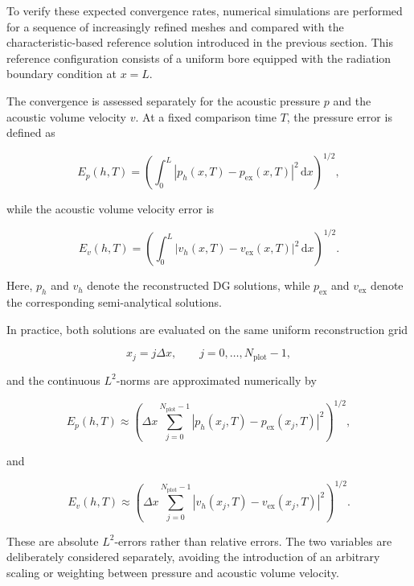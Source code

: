 \documentclass[11pt,a4paper]{report}
\theoremstyle{plain}
\theoremstyle{definition}
\begin{document}
To verify these expected convergence rates, numerical simulations are performed
for a sequence of increasingly refined meshes and compared with the
characteristic-based reference solution introduced in the previous section.
This reference configuration consists of a uniform bore equipped with the
radiation boundary condition at \(x=L\).

The convergence is assessed separately for the acoustic pressure \(p\) and the
acoustic volume velocity \(v\). At a fixed comparison time \(T\), the pressure
error is defined as

\begin{equation}
E_p(h,T)
=
\left(
\int_0^L
\left|
p_h(x,T)-p_{\mathrm{ex}}(x,T)
\right|^2
\,\mathrm dx
\right)^{1/2},
\label{eq:error_pressure}
\end{equation}

while the acoustic volume velocity error is

\begin{equation}
E_v(h,T)
=
\left(
\int_0^L
\left|
v_h(x,T)-v_{\mathrm{ex}}(x,T)
\right|^2
\,\mathrm dx
\right)^{1/2}.
\label{eq:error_velocity}
\end{equation}

Here, \(p_h\) and \(v_h\) denote the reconstructed DG solutions, while
\(p_{\mathrm{ex}}\) and \(v_{\mathrm{ex}}\) denote the corresponding semi-analytical
solutions.

In practice, both solutions are evaluated on the same uniform reconstruction
grid

\begin{equation}
x_j=j\Delta x,
\qquad
j=0,\ldots,N_{\mathrm{plot}}-1,
\end{equation}

and the continuous \(L^2\)-norms are approximated numerically by

\begin{equation}
E_p(h,T)
\approx
\left(
\Delta x
\sum_{j=0}^{N_{\mathrm{plot}}-1}
\left|
p_h(x_j,T)-p_{\mathrm{ex}}(x_j,T)
\right|^2
\right)^{1/2},
\label{eq:discrete_error_pressure}
\end{equation}

and

\begin{equation}
E_v(h,T)
\approx
\left(
\Delta x
\sum_{j=0}^{N_{\mathrm{plot}}-1}
\left|
v_h(x_j,T)-v_{\mathrm{ex}}(x_j,T)
\right|^2
\right)^{1/2}.
\label{eq:discrete_error_velocity}
\end{equation}

These are absolute \(L^2\)-errors rather than relative errors. The two variables
are deliberately considered separately, avoiding the introduction of an
arbitrary scaling or weighting between pressure and acoustic volume velocity.
\end{document}
